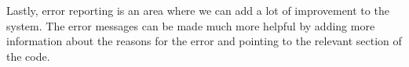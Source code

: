 \documentclass{acm_proc_article-sp}
\begin{document}
Lastly, error reporting is an area where we can add a lot of improvement to the system. The error messages can be made much more helpful by adding more information about the reasons for the error and pointing to the relevant section of the code. 




\end{document}
